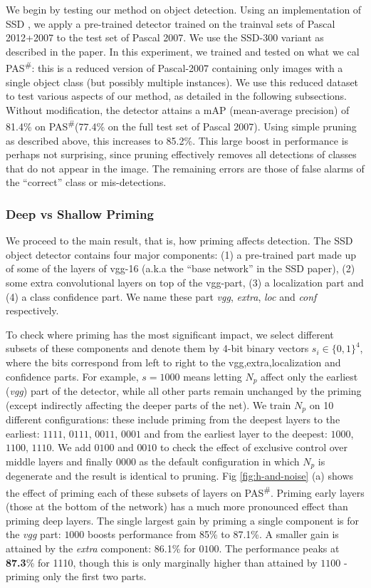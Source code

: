 \documentclass[10pt,letterpaper,twocolumn]{article}
\begin{document}
We begin by testing our method on object detection. Using an implementation
of SSD \cite{liu2016ssd}, we apply a pre-trained detector trained
on the trainval sets of Pascal 2012+2007 to the test set of Pascal
2007. We use the SSD-300 variant as described in the paper. In this
experiment, we trained and tested on what we cal PAS\textsuperscript{\#}:
this is a reduced version of Pascal-2007 containing only images with
a single object class (but possibly multiple instances). We use this
reduced dataset to test various aspects of our method, as detailed
in the following subsections. Without modification, the detector attains
a mAP (mean-average precision) of 81.4\% on PAS\textsuperscript{\#}(77.4\%
on the full test set of Pascal 2007). Using simple pruning as described
above, this increases to 85.2\%. This large boost in performance is
perhaps not surprising, since pruning effectively removes all detections
of classes that do not appear in the image. The remaining errors are
those of false alarms of the ``correct'' class or mis-detections. 

\subsubsection{Deep vs Shallow Priming}

We proceed to the main result, that is, how priming affects detection.
The SSD object detector contains four major components: (1) a pre-trained
part made up of some of the layers of vgg-16 \cite{simonyan2014very}
(a.k.a the ``base network'' in the SSD paper), (2) some extra convolutional
layers on top of the vgg-part, (3) a localization part and (4) a class
confidence part. We name these part \emph{vgg}, \emph{extra}, \emph{loc
}and \emph{conf }respectively. 

To check where priming has the most significant impact, we select
different subsets of these components and denote them by 4-bit binary
vectors $s_{i}\in\{0,1\}^{4}$, where the bits correspond from left
to right to the vgg,extra,localization and confidence parts. For example,
$s=1000$ means letting $N_{p}$ affect only the earliest (\emph{vgg})
part of the detector, while all other parts remain unchanged by the
priming (except indirectly affecting the deeper parts of the net).
We train $N_{p}$ on 10 different configurations: these include priming
from the deepest layers to the earliest: $1111$, $0111$, $0011$,
$0001$ and from the earliest layer to the deepest: $1000$, $1100$,
$1110$. We add $0100$ and $0010$ to check the effect of exclusive
control over middle layers and finally $0000$ as the default configuration
in which $N_{p}$ is degenerate and the result is identical to pruning.
Fig \ref{fig:h-and-noise} (a) shows the effect of priming each of
these subsets of layers on PAS\textsuperscript{\#}. Priming early
layers (those at the bottom of the network) has a much more pronounced
effect than priming deep layers. The single largest gain by priming
a single component is for the \emph{vgg} part: $1000$ boosts performance
from 85\% to 87.1\%. A smaller gain is attained by the \emph{extra}
component: 86.1\% for $0100$. The performance peaks at \textbf{87.3}\%
for 1110, though this is only marginally higher than attained by $1100$
- priming only the first two parts. 
\end{document}
